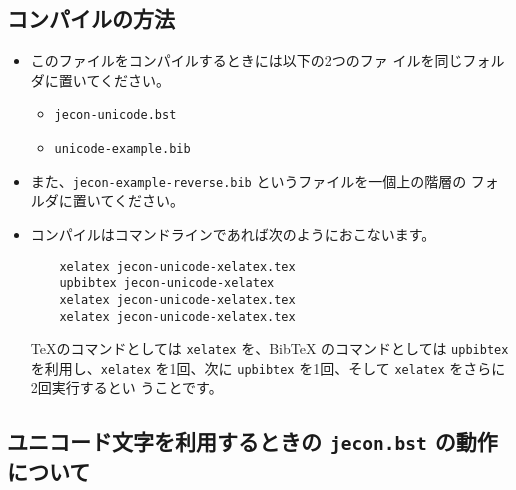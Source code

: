 \documentclass[a4paper,10pt]{bxjsarticle}
\begin{document}
\subsection{コンパイルの方法}

\begin{itemize}
 \item このファイルをコンパイルするときには以下の2つのファ
       イルを同じフォルダに置いてください。
       \begin{itemize}
        \item \texttt{jecon-unicode.bst}
        \item \texttt{unicode-example.bib}
       \end{itemize}
 \item また、\texttt{jecon-example-reverse.bib} というファイルを一個上の階層の
       フォルダに置いてください。
 \item コンパイルはコマンドラインであれば次のようにおこないます。
\begin{verbatim}
    xelatex jecon-unicode-xelatex.tex
    upbibtex jecon-unicode-xelatex
    xelatex jecon-unicode-xelatex.tex               
    xelatex jecon-unicode-xelatex.tex
\end{verbatim}
       \TeX のコマンドとしては \texttt{xelatex} を、BibTeX のコマンドとしては
       \texttt{upbibtex} を利用し、\texttt{xelatex} を1回、次に
       \texttt{upbibtex} を1回、そして \texttt{xelatex} をさらに2回実行するとい
       うことです。
\end{itemize}

\subsection{ユニコード文字を利用するときの \texttt{jecon.bst} の動作について}
\end{document}
